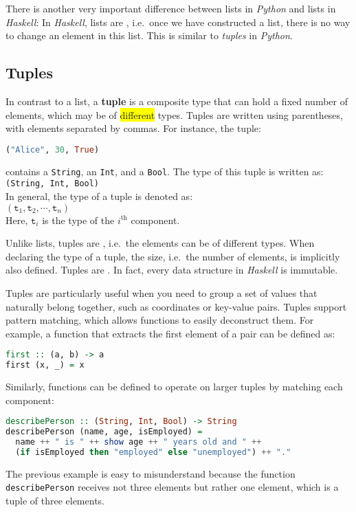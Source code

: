 There is another very important difference between lists in \textsl{Python} and lists in \textsl{Haskell}: In
\textsl{Haskell}, lists are , i.e.~once we have constructed a list, there is no way to change
an element in this list.  This is similar to \textsl{tuples} in \textsl{Python}.

\subsection{Tuples}
In contrast to a list, a \textbf{tuple} is a composite type that can hold a fixed number of elements, which may
be of \colorbox{yellow}{different} types. Tuples are written using parentheses, with elements separated by commas. For instance, the tuple:
\begin{lstlisting}[style=haskellstyle, language=Haskell]
("Alice", 30, True)
\end{lstlisting}
contains a \texttt{String}, an \texttt{Int}, and a \texttt{Bool}. The type of this tuple is written as:\\[0.2cm]
\hspace*{1.3cm}
\texttt{(String, Int, Bool)}
\\[0.2cm]
In general, the type of a tuple is denoted as:
\\[0.2cm]
\hspace*{1.3cm}
$(\texttt{t}_1, \texttt{t}_2, \cdots, \texttt{t}_n)$
\\[0.2cm]
Here, $\texttt{t}_i$ is the type of the $i^{\textrm{th}}$ component.

Unlike lists, tuples are , i.e.~the elements can be of different types.  When declaring the
type of a tuple, the size, i.e.~the number of elements, is implicitly also defined.  Tuples are
.  In fact, every data structure in \textsl{Haskell} is immutable.  

Tuples are particularly useful when you need to group a set of values that
naturally belong together, such as coordinates or key-value pairs. 
Tuples support pattern matching, which allows functions to easily deconstruct them. For example, a function
that extracts the first element of a pair can be defined as: 
\begin{lstlisting}[style=haskellstyle, language=Haskell]
first :: (a, b) -> a
first (x, _) = x
\end{lstlisting}
Similarly, functions can be defined to operate on larger tuples by matching each component:
\begin{lstlisting}[style=haskellstyle, language=Haskell]
describePerson :: (String, Int, Bool) -> String
describePerson (name, age, isEmployed) =
  name ++ " is " ++ show age ++ " years old and " ++
  (if isEmployed then "employed" else "unemployed") ++ "."
\end{lstlisting}
The previous example is easy to misunderstand because the function \texttt{describePerson} receives not three
elements but rather one element, which is a tuple of three elements.


